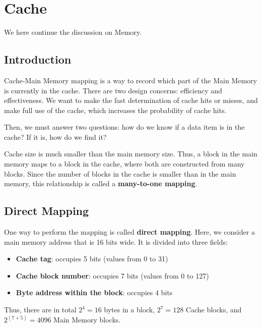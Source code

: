 \chapter{Cache}

We here continue the discussion on Memory. 

\section{Introduction}
Cache-Main Memory mapping is a way to record which part of the Main Memory is currently in the cache. There are two design concerns: efficiency and effectiveness. We want to make the fast determination of cache hits or misses, and make full use of the cache, which increases the probability of cache hits.

Then, we must answer two questions: how do we know if a data item is in the cache? If it is, how do we find it?

Cache size is much smaller than the main memory size. Thus, a block in the main memory maps to a block in the cache, where both are constructed from many blocks. Since the number of blocks in the cache is smaller than in the main memory, this relationship is called a \textbf{many-to-one mapping}.

\section{Direct Mapping}
One way to perform the mapping is called \textbf{direct mapping}. Here, we consider a main memory address that is 16 bits wide. It is divided into three fields:
\begin{itemize}
  \item \textbf{Cache tag}: occupies 5 bits (values from 0 to 31)
  \item \textbf{Cache block number}: occupies 7 bits (values from 0 to 127)
  \item \textbf{Byte address within the block}: occupies 4 bits
\end{itemize}

Thus, there are in total \(2^4 = 16\) bytes in a block, \(2^7 = 128\) Cache blocks, and \(2^{(7 + 5)} = 4096\) Main Memory blocks.

